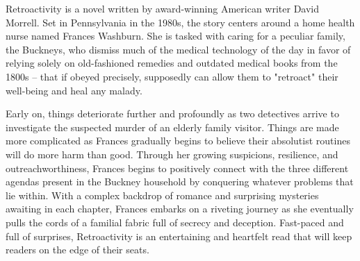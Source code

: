 

Retroactivity is a novel written by award-winning American writer David Morrell. Set in Pennsylvania in the 1980s, the story centers around a home health nurse named Frances Washburn. She is tasked with caring for a peculiar family, the Buckneys, who dismiss much of the medical technology of the day in favor of relying solely on old-fashioned remedies and outdated medical books from the 1800s – that if obeyed precisely, supposedly can allow them to "retroact" their well-being and heal any malady. 

Early on, things deteriorate further and profoundly as two detectives arrive to investigate the suspected murder of an elderly family visitor. Things are made more complicated as Frances gradually begins to believe their absolutist routines will do more harm than good. Through her growing suspicions, resilience, and outreachworthiness, Frances begins to positively connect with the three different agendas present in the Buckney household by conquering whatever problems that lie within. With a complex backdrop of romance and surprising mysteries awaiting in each chapter, Frances embarks on a riveting journey as she eventually pulls the cords of a familial fabric full of secrecy and deception. Fast-paced and full of surprises, Retroactivity is an entertaining and heartfelt read that will keep readers on the edge of their seats.